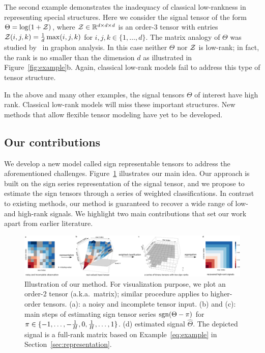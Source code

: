 \documentclass[11pt]{article}
\theoremstyle{plain}
\theoremstyle{definition}
\def\sign{\textup{sgn}}
\begin{document}
The second example demonstrates the inadequacy of classical low-rankness in representing special structures. Here we consider the signal tensor of the form $\Theta=\log(1+\mathcal{Z})$, where $\mathcal{Z}\in\mathbb{R}^{d\times d\times d}$ is an order-3 tensor with entries $\mathcal{Z}(i,j,k)={1\over d}\max(i,j,k)$ for $i,j,k\in\{1,\ldots,d\}$. The matrix analogy of $\Theta$ was studied by~\cite{chan2014consistent} in graphon analysis. In this case neither $\Theta$ nor $\mathcal{Z}$ is low-rank; in fact, the rank is no smaller than the dimension $d$ as illustrated in Figure~\ref{fig:example}b. Again, classical low-rank models fail to address this type of tensor structure. 

In the above and many other examples, the signal tensors $\Theta$ of interest have high rank. Classical low-rank models will miss these important structures. New methods that allow flexible tensor modeling have yet to be developed. 


\subsection{Our contributions}
We develop a new model called sign representable tensors to address the aforementioned challenges. 
Figure~\ref{fig:demo} illustrates our main idea. Our approach is built on the sign series representation of the signal tensor, and we propose to estimate the sign tensors through a series of weighted classifications. In contrast to existing methods, our method is guaranteed to recover a wide range of low- and high-rank signals. We highlight two main contributions that set our work apart from earlier literature. 

\begin{figure}[h!]
\centerline{\includegraphics[width=1\textwidth]{figure/demo.pdf}}
\caption{Illustration of our method. For visualization purpose, we plot an order-2 tensor (a.k.a.\ matrix); similar procedure applies to higher-order tensors. (a): a noisy and incomplete tensor input. (b) and (c): main steps of estimating sign tensor series $\sign(\Theta-\pi)$ for $\pi\in  \{-1,\ldots,-{1\over H},0,{1\over H},\ldots,1\}$. (d) estimated signal $\hat \Theta$. The depicted signal is a full-rank matrix based on Example~\ref{eq:example} in Section~\ref{sec:representation}.}\label{fig:demo}
\end{figure}
\end{document}
